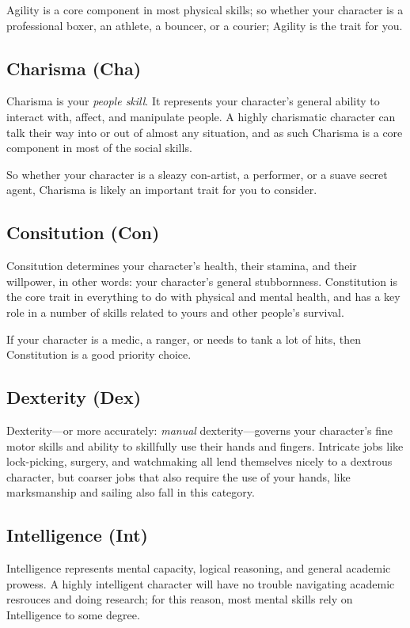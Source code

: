 Agility is a core component in most physical skills; so whether your character is a professional boxer, an athlete, a bouncer, or a courier; Agility is the trait for you.

\subsection{Charisma (Cha)}
Charisma is your \textit{people skill}.
It represents your character's general ability to interact with, affect, and manipulate people.
A highly charismatic character can talk their way into or out of almost any situation, and as such Charisma is a core component in most of the social skills.

So whether your character is a sleazy con-artist, a performer, or a suave secret agent, Charisma is likely an important trait for you to consider.

\subsection{Consitution (Con)}
Consitution determines your character's health, their stamina, and their willpower, in other words: your character's general stubbornness.
Constitution is the core trait in everything to do with physical and mental health, and has a key role in a number of skills related to yours and other people's survival.

If your character is a medic, a ranger, or needs to tank a lot of hits, then Constitution is a good priority choice.

\subsection{Dexterity (Dex)}
Dexterity---or more accurately: \textit{manual} dexterity---governs your character's fine motor skills and ability to skillfully use their hands and fingers.
Intricate jobs like lock-picking, surgery, and watchmaking all lend themselves nicely to a dextrous character, but coarser jobs that also require the use of your hands, like marksmanship and sailing also fall in this category.


\subsection{Intelligence (Int)}
Intelligence represents mental capacity, logical reasoning, and general academic prowess.
A highly intelligent character will have no trouble navigating academic resrouces and doing research; for this reason, most mental skills rely on Intelligence to some degree.

